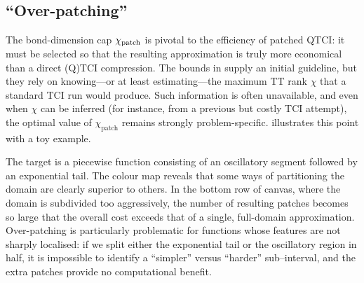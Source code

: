 \subsection{``Over-patching''}
The bond-dimension cap \(\chi_{\text{patch}}\) is pivotal to the efficiency of patched QTCI: it must be selected so that the resulting approximation is truly more economical than a direct (Q)TCI compression. The bounds in  supply an initial guideline, but they rely on knowing—or at least estimating—the maximum TT rank \(\chi\) that a standard TCI run would produce.  Such information is often unavailable, and even when \(\chi\) can be inferred (for instance, from a previous but costly TCI attempt), the optimal value of \(\chi_{\text{patch}}\) remains strongly problem-specific.
 illustrates this point with a toy example. 

The target is a piecewise function consisting of an oscillatory segment followed by an exponential tail. The colour map reveals that some ways of partitioning the domain are clearly superior to others. In the bottom row of canvas, where the domain is subdivided too aggressively, the number of resulting patches becomes so large that the overall cost exceeds that of a single, full-domain approximation. Over-patching is particularly problematic for functions whose features are not sharply localised: if we split either the exponential tail or the oscillatory region in half, it is impossible to identify a “simpler” versus “harder” sub–interval, and the extra patches provide no computational benefit. 


